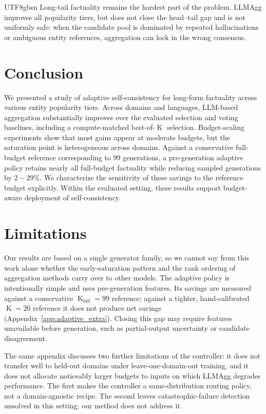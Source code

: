 \documentclass[11pt]{article}
\begin{document}
\begin{CJK*}{UTF8}{gbsn}
Long-tail factuality remains the hardest part of the problem. LLMAgg improves all popularity tiers, but does not close the head--tail gap and is not uniformly safe: when the candidate pool is dominated by repeated hallucinations or ambiguous entity references, aggregation can lock in the wrong consensus. %

\section{Conclusion}

We presented a study of adaptive self-consistency for long-form factuality across various entity popularity tiers. Across domains and languages, LLM-based aggregation substantially improves over the evaluated selection and voting baselines, including a compute-matched best-of-$\operatorname{K}$ selection. Budget-scaling experiments show that most gains appear at moderate budgets, but the saturation point is heterogeneous across domains. Against a conservative full-budget reference corresponding to 99 generations, a pre-generation adaptive policy retains nearly all full-budget factuality while reducing sampled generations by $2\!-\!29$\%. We characterize the sensitivity of these savings to the reference budget explicitly. Within the evaluated setting, these results support budget-aware deployment of self-consistency.

\section*{Limitations}

Our results are based on a single generator family, so we cannot say from this work alone whether the early-saturation pattern and the rank ordering of aggregation methods carry over to other models. The adaptive policy is intentionally simple and uses pre-generation features. Its savings are measured against a conservative $\operatorname{K}_{\text{full}}\!=\!99$ reference; against a tighter, hand-calibrated $\operatorname{K}\!=\!\!20$ reference it does not produce net savings (Appendix~\ref{app:adaptive_extra}). Closing this gap may require features unavailable before generation, such as partial-output uncertainty or candidate disagreement.

The same appendix discusses two further limitations of the controller: it does not transfer well to held-out domains under leave-one-domain-out training, and it does not allocate noticeably larger budgets to inputs on which LLMAgg degrades performance. The first makes the controller a same-distribution routing policy, not a domain-agnostic recipe. The second leaves catastrophic-failure detection unsolved in this setting; our method does not address it.


\end{CJK*}
\end{document}
